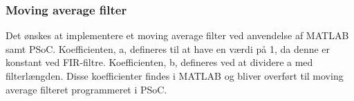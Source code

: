 \subsubsection{Moving average filter}
Det ønskes at implementere et moving average filter ved anvendelse af MATLAB samt PSoC. Koefficienten, a, defineres til at have en værdi på 1, da denne er konstant ved FIR-filtre. Koefficienten, b, defineres ved at dividere a med filterlængden. Disse koefficienter findes i MATLAB og bliver overført til moving average filteret programmeret i PSoC. 

